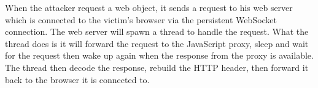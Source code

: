 When the attacker request a web object, it sends a request to his web server which is connected to the victim's browser via the persistent WebSocket connection. The web server will spawn a thread to handle the request. What the thread does is it will forward the request to the JavaScript proxy, sleep and wait for the request then wake up again when the response from the proxy is available. The thread then decode the response, rebuild the HTTP header, then forward it back to the browser it is connected to.
